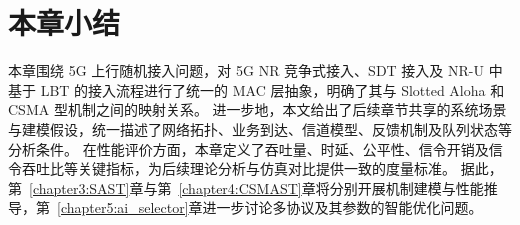 \section{本章小结}
\label{sec:chapter2_summary}


本章围绕 5G 上行随机接入问题，对 5G NR 竞争式接入、SDT 接入及 NR-U 中基于 LBT 的接入流程进行了统一的 MAC 层抽象，明确了其与 Slotted Aloha 和 CSMA 型机制之间的映射关系。
进一步地，本文给出了后续章节共享的系统场景与建模假设，统一描述了网络拓扑、业务到达、信道模型、反馈机制及队列状态等分析条件。
在性能评价方面，本章定义了吞吐量、时延、公平性、信令开销及信令吞吐比等关键指标，为后续理论分析与仿真对比提供一致的度量标准。
据此，第~\ref{chapter3:SAST}章与第~\ref{chapter4:CSMAST}章将分别开展机制建模与性能推导，第~\ref{chapter5:ai_selector}章进一步讨论多协议及其参数的智能优化问题。
	
